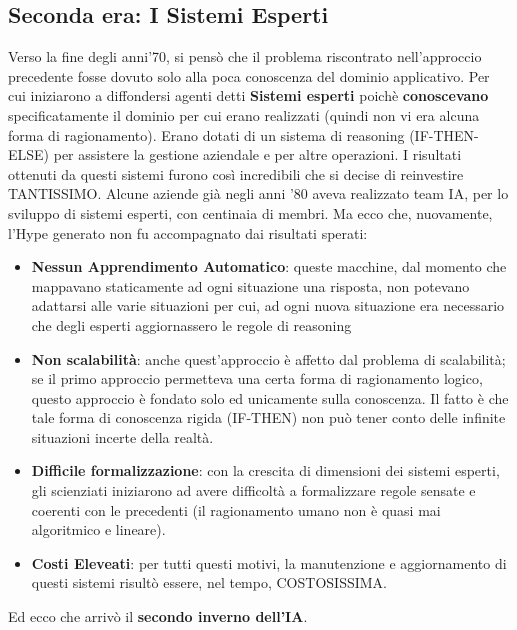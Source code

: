 \subsection{Seconda era: I Sistemi Esperti}
Verso la fine degli anni'70, si pensò che il problema riscontrato nell'approccio precedente fosse dovuto 
solo alla poca conoscenza del dominio applicativo. Per cui iniziarono a diffondersi agenti detti \textbf{Sistemi esperti} poichè \textbf{conoscevano}
specificatamente il dominio per cui erano realizzati (quindi non vi era alcuna forma di ragionamento). Erano dotati di un sistema di reasoning (IF-THEN-ELSE) per assistere la gestione aziendale e 
per altre operazioni. I risultati ottenuti da questi sistemi furono così incredibili che si decise di reinvestire TANTISSIMO. Alcune aziende
già negli anni '80 aveva realizzato team IA, per lo sviluppo di sistemi esperti, con centinaia di membri.
Ma ecco che, nuovamente, l'Hype generato non fu accompagnato dai risultati sperati:
\begin{itemize}
    \item \textbf{Nessun Apprendimento Automatico}: queste macchine, dal momento che mappavano staticamente ad ogni situazione una risposta, non potevano adattarsi alle varie situazioni
    per cui, ad ogni nuova situazione era necessario che degli esperti aggiornassero le regole di reasoning
    \item \textbf{Non scalabilità}: anche quest'approccio è affetto dal problema di scalabilità; se il primo approccio permetteva una certa forma di ragionamento logico, questo approccio è fondato solo ed unicamente sulla conoscenza. 
    Il fatto è che tale forma di conoscenza rigida (IF-THEN) non può tener conto delle infinite situazioni incerte della realtà.
    \item \textbf{Difficile formalizzazione}: con la crescita di dimensioni dei sistemi esperti, gli scienziati iniziarono ad avere
    difficoltà a formalizzare regole sensate e coerenti con le precedenti (il ragionamento umano non è quasi mai algoritmico e lineare).
    \item \textbf{Costi Eleveati}: per tutti questi motivi, la manutenzione e aggiornamento di questi sistemi risultò essere, nel tempo, COSTOSISSIMA.
\end{itemize}
Ed ecco che arrivò il \textbf{secondo inverno dell'IA}.

